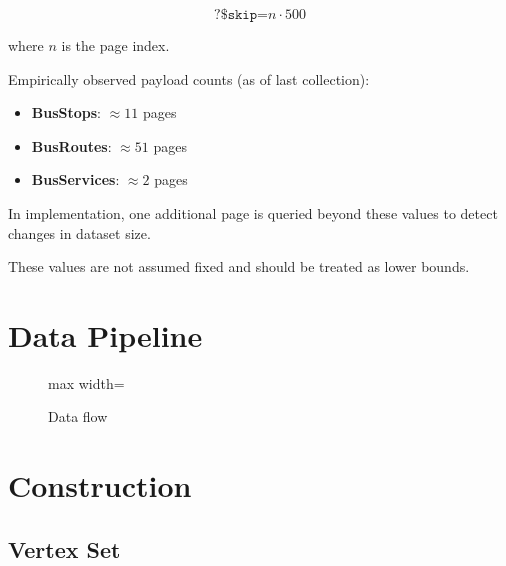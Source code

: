 \documentclass[11pt,a4paper]{article}
\begin{document}
\[
\texttt{?\$skip=} n \cdot 500
\]

where $n$ is the page index.

Empirically observed payload counts (as of last collection):

\begin{itemize}
    \item \textbf{BusStops}: $\approx 11$ pages
    \item \textbf{BusRoutes}: $\approx 51$ pages
    \item \textbf{BusServices}: $\approx 2$ pages
\end{itemize}

In implementation, one additional page is queried beyond these values to detect changes in dataset size.

These values are not assumed fixed and should be treated as lower bounds.

\section{Data Pipeline}

\begin{figure}[H]
\centering
\begin{adjustbox}{max width=\textwidth}
\end{adjustbox}
\caption{Data flow}
\end{figure}

\section{Construction}

\subsection{Vertex Set}
\end{document}
